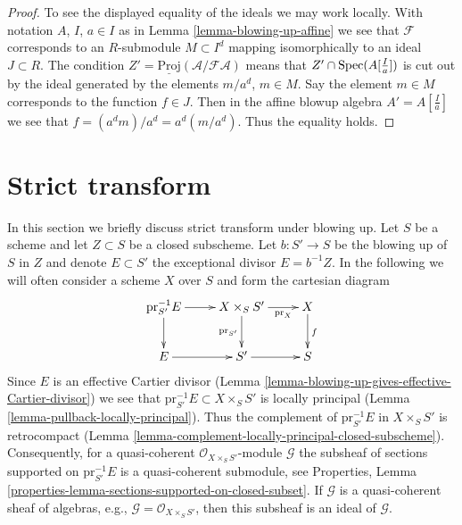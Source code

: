 \begin{proof}
\medskip\noindent
To see the displayed equality of the ideals we may work locally.
With notation $A$, $I$, $a \in I$ as in Lemma \ref{lemma-blowing-up-affine}
we see that $\mathcal{F}$ corresponds to an $R$-submodule $M \subset I^d$
mapping isomorphically to an ideal $J \subset R$. The condition
$Z' = \underline{\text{Proj}}(\mathcal{A}/\mathcal{F}\mathcal{A})$
means that $Z' \cap \mathop{\mathrm{Spec}}(A[\frac{I}{a}])$ is cut out by the ideal
generated by the elements $m/a^d$, $m \in M$. Say the element $m \in M$
corresponds to the function $f \in J$. Then in the affine blowup algebra
$A' = A[\frac{I}{a}]$ we see that $f = (a^dm)/a^d = a^d (m/a^d)$.
Thus the equality holds.
\end{proof}






\section{Strict transform}
\label{section-strict-transform}

\noindent
In this section we briefly discuss strict transform under blowing up.
Let $S$ be a scheme and let $Z \subset S$ be a closed subscheme.
Let $b : S' \to S$ be the blowing up of $S$ in $Z$ and denote $E \subset S'$
the exceptional divisor $E = b^{-1}Z$. In the following we will often
consider a scheme $X$ over $S$ and form the cartesian diagram
$$
\xymatrix{
\text{pr}_{S'}^{-1}E \ar[r] \ar[d] &
X \times_S S' \ar[r]_-{\text{pr}_X} \ar[d]_{\text{pr}_{S'}} &
X \ar[d]^f \\
E \ar[r] & S' \ar[r] & S
}
$$
Since $E$ is an effective Cartier divisor
(Lemma \ref{lemma-blowing-up-gives-effective-Cartier-divisor})
we see that $\text{pr}_{S'}^{-1}E \subset X \times_S S'$
is locally principal
(Lemma \ref{lemma-pullback-locally-principal}).
Thus the complement of $\text{pr}_{S'}^{-1}E$ in $X \times_S S'$
is retrocompact
(Lemma \ref{lemma-complement-locally-principal-closed-subscheme}).
Consequently, for a quasi-coherent $\mathcal{O}_{X \times_S S'}$-module
$\mathcal{G}$ the subsheaf of sections supported on $\text{pr}_{S'}^{-1}E$
is a quasi-coherent submodule, see
Properties, Lemma \ref{properties-lemma-sections-supported-on-closed-subset}.
If $\mathcal{G}$ is a quasi-coherent sheaf of algebras, e.g.,
$\mathcal{G} = \mathcal{O}_{X \times_S S'}$, then this subsheaf is an ideal
of $\mathcal{G}$.

